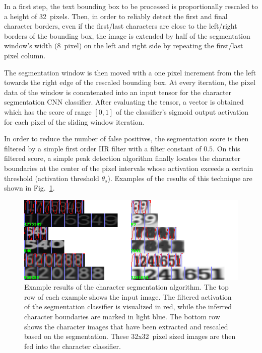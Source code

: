 \documentclass[12pt]{article}
\newcommand\figref[1]{Fig.~\ref{fig:#1}}
\begin{document}
In a first step, the text bounding box to be processed is proportionally rescaled to a height of 32~pixels.
Then, in order to reliably detect the first and final character borders, even if the first/last
characters are close to the left/right borders of the bounding box, the image is extended by
half of the segmentation window's width (8~pixel) on the left and right side by repeating the first/last
pixel column.

The segmentation window is then moved with a one pixel increment from the left towards the right
edge of the rescaled bounding box. At every iteration, the pixel data of the window is concatenated
into an input tensor for the character segmentation CNN classifier. After evaluating the
tensor, a vector is obtained which has the score of range $[0,1]$ of the classifier's sigmoid output activation
for each pixel of the sliding window iteration.

In order to reduce the number of false positives, the segmentation score is then filtered by
a simple first order IIR filter \cite{Infinite55:online} with a filter constant of $0.5$. On this
filtered score, a simple peak detection algorithm finally locates the character boundaries at
the center of the pixel intervals whose activation exceeds a certain threshold
(activation threshold $\theta_s$). Examples of the results of this technique are shown
in \figref{segmentation}.

\begin{figure}[ht]
    \centering
    \includegraphics[width=1.1\linewidth]{fig/segmentation}
    \caption{
      Example results of the character segmentation algorithm. The top row of each example shows the input
      image. The filtered activation of the segmentation classifier is visualized in red,
      while the inferred character boundaries are marked in light blue.
      The bottom row shows the character images that have been extracted and rescaled based on the
      segmentation. These 32x32~pixel sized images are then fed into the character classifier. }
    \label{fig:segmentation}
\end{figure}
\end{document}
